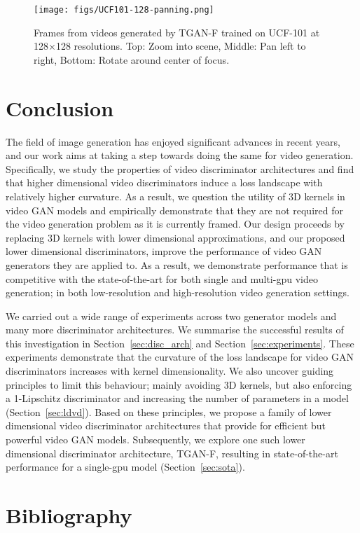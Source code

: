\documentclass[a4paper,fleqn]{cas-sc}
\begin{document}
\begin{figure}[pos=!h]
    \centering
    \texttt{[image: figs/UCF101-128-panning.png]}
    
    \caption{Frames from videos generated by TGAN-F trained on UCF-101 at
128$\times$128 resolutions. Top: Zoom into scene, Middle: Pan left to right, Bottom: Rotate around center of focus.} 
    \label{fig:UCF101_ldvd_128}
\end{figure}


\section{Conclusion}
\label{sec:end}
The field of image generation has enjoyed significant advances in recent years, and our work aims at taking a step towards doing the same for video generation. Specifically, we study the properties of video discriminator architectures and find that higher dimensional video discriminators induce a loss landscape with relatively higher curvature. As a result, we question the utility of 3D kernels in video GAN models and empirically demonstrate that they are not required for the video generation problem as it is currently framed. Our design proceeds by replacing 3D kernels with lower dimensional approximations, and our proposed lower dimensional discriminators, improve the performance of video GAN generators they are applied to. As a result, we demonstrate performance that is competitive with the state-of-the-art for both single and multi-gpu video generation; in both low-resolution and high-resolution video generation settings. 

We carried out a wide range of experiments across two generator models and many more discriminator architectures. We summarise the successful results of this investigation in Section~\ref{sec:disc_arch} and Section~\ref{sec:experiments}. These experiments demonstrate that the curvature of the loss landscape for video GAN discriminators increases with kernel dimensionality. We also uncover guiding principles to limit this behaviour; mainly avoiding 3D kernels, but also enforcing a 1-Lipschitz discriminator and increasing the number of parameters in a model (Section~\ref{sec:ldvd}). Based on these principles, we propose a family of lower dimensional video discriminator architectures that provide for efficient but powerful video GAN models. Subsequently, we explore one such lower dimensional discriminator architecture, TGAN-F, resulting in state-of-the-art performance for a single-gpu model (Section~\ref{sec:sota}).\\


\clearpage
\section{Bibliography}




\end{document}
